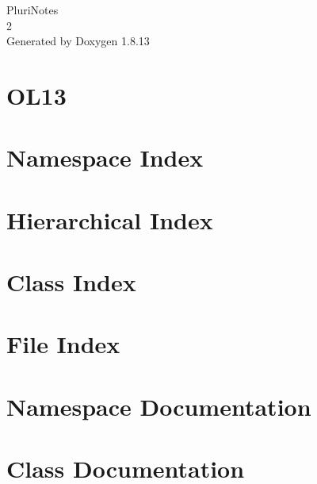 \documentclass[twoside]{book}
\newcommand{\+}{\discretionary{\mbox{\scriptsize$\hookleftarrow$}}{}{}}
\newcommand{\clearemptydoublepage}{%
  \newpage{\pagestyle{empty}\cleardoublepage}%
}
\begin{document}
\hypersetup{pageanchor=false,
             bookmarksnumbered=true,
             pdfencoding=unicode
            }
\begin{titlepage}
\vspace*{7cm}
\begin{center}%
{\Large Pluri\+Notes \\[1ex]\large 2 }\\
\vspace*{1cm}
{\large Generated by Doxygen 1.8.13}\\
\end{center}
\end{titlepage}
\clearemptydoublepage
{}
\tableofcontents
\clearemptydoublepage
{}
\hypersetup{pageanchor=true}

\chapter{O\+L13}
\label{md__o_l13__r_e_a_d_m_e}

\chapter{Namespace Index}

\chapter{Hierarchical Index}

\chapter{Class Index}

\chapter{File Index}

\chapter{Namespace Documentation}

\chapter{Class Documentation}


































\end{document}
